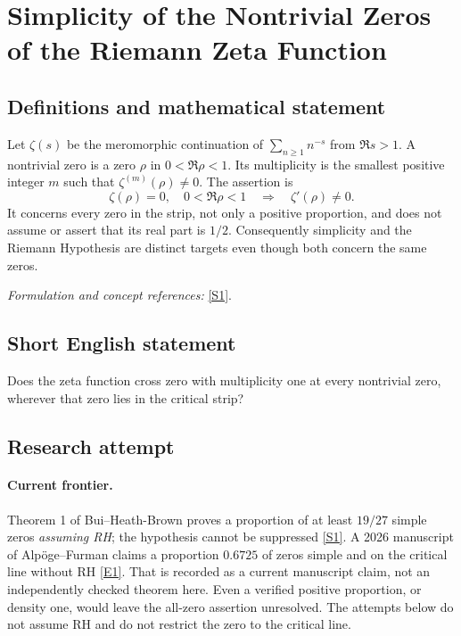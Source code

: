 \documentclass[11pt,a4paper]{article}
\newcommand{\sref}[2]{\hyperlink{source:#1:#2}{[S#2]}}
\newcommand{\eref}[2]{\hyperlink{extra:#1:#2}{[E#2]}}
\newif\ifshowcatalogue
\newcommand{\cataloguescope}[1]{\ifshowcatalogue
 \paragraph{Exact scope in the supplied catalogue.}
 \begin{quote}\small #1\end{quote}\fi}
\numberwithin{equation}{section}
\begin{document}
\setcounter{section}{0}
\clearpage
\section*{\texorpdfstring{Simplicity of the Nontrivial Zeros of the Riemann Zeta Function}{Simplicity of the Nontrivial Zeros of the Riemann Zeta Function}}\label{30006766}
\subsection{Definitions and mathematical statement}
Let $\zeta(s)$ be the meromorphic continuation of $\sum_{n\ge1}n^{-s}$ from $\Re s>1$. A nontrivial zero is a zero $\rho$ in $0<\Re\rho<1$. Its multiplicity is the smallest positive integer $m$ such that $\zeta^{(m)}(\rho)\ne0$. The assertion is
\[
 \zeta(\rho)=0,\quad0<\Re\rho<1\quad\Longrightarrow\quad\zeta'(\rho)\ne0.
\]
It concerns every zero in the strip, not only a positive proportion, and does not assume or assert that its real part is $1/2$. Consequently simplicity and the Riemann Hypothesis are distinct targets even though both concern the same zeros.
\par\smallskip\textit{Formulation and concept references:} \sref{30006766}{1}.
\cataloguescope{Prove that zeta'(rho) is nonzero for every nontrivial zero rho of the Riemann zeta function; equivalently, every nontrivial zero of zeta(s) has multiplicity exactly one.}
\subsection{Short English statement}
Does the zeta function cross zero with multiplicity one at every nontrivial zero, wherever that zero lies in the critical strip?
\subsection{Research attempt}

\paragraph{Current frontier.}
Theorem 1 of Bui--Heath-Brown proves a proportion of at least $19/27$ simple
zeros \emph{assuming RH}; the hypothesis cannot be suppressed
\sref{30006766}{1}. A 2026 manuscript of Alp\"oge--Furman claims a proportion
$0.6725$ of zeros simple and on the critical line without RH
\eref{30006766}{1}. That is recorded as a current manuscript claim, not an
independently checked theorem here. Even a verified positive proportion,
or density one, would leave the all-zero assertion unresolved. The attempts
below do not assume RH and do not restrict the zero to the critical line.
\end{document}
